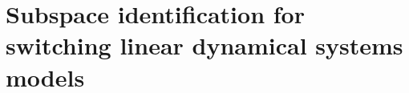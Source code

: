 \chapter{Subspace identification for switching linear dynamical systems models\label{ch:glmhmm}}





